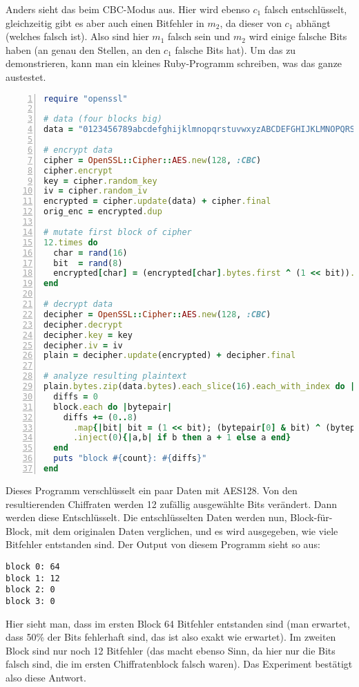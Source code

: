 \documentclass[
  ngerman,
  DIV=12
]{scrartcl}
\begin{document}
Anders sieht das beim CBC-Modus aus. Hier wird ebenso $c_1$ falsch entschlüsselt,  gleichzeitig gibt es aber auch einen Bitfehler in $m_2$, da dieser von $c_1$ abhängt (welches falsch ist). Also sind hier $m_1$ falsch sein und $m_2$ wird einige falsche Bits haben (an genau den Stellen, an den $c_1$ falsche Bits hat).
Um das zu demonstrieren, kann man ein kleines Ruby-Programm schreiben, was das ganze austestet. 
\begin{lstlisting}[language=ruby,numbers=left]
require "openssl"

# data (four blocks big)
data = "0123456789abcdefghijklmnopqrstuvwxyzABCDEFGHIJKLMNOPQRSTUVWXYZ;"

# encrypt data
cipher = OpenSSL::Cipher::AES.new(128, :CBC)
cipher.encrypt
key = cipher.random_key
iv = cipher.random_iv
encrypted = cipher.update(data) + cipher.final
orig_enc = encrypted.dup

# mutate first block of cipher
12.times do
  char = rand(16)
  bit  = rand(8)
  encrypted[char] = (encrypted[char].bytes.first ^ (1 << bit)).chr
end

# decrypt data
decipher = OpenSSL::Cipher::AES.new(128, :CBC)
decipher.decrypt
decipher.key = key
decipher.iv = iv
plain = decipher.update(encrypted) + decipher.final

# analyze resulting plaintext
plain.bytes.zip(data.bytes).each_slice(16).each_with_index do |block, count|
  diffs = 0
  block.each do |bytepair|
    diffs += (0..8)
      .map{|bit| bit = (1 << bit); (bytepair[0] & bit) ^ (bytepair[1] & bit) != 0}
      .inject(0){|a,b| if b then a + 1 else a end}
  end
  puts "block #{count}: #{diffs}"
end  
\end{lstlisting}
Dieses Programm verschlüsselt ein paar Daten mit AES128. Von den resultierenden Chiffraten werden 12 zufällig ausgewählte Bits verändert. Dann werden diese Entschlüsselt. Die entschlüsselten Daten werden nun, Block-für-Block, mit dem originalen Daten verglichen, und es wird ausgegeben, wie viele Bitfehler entstanden sind. Der Output von diesem Programm sieht so aus:
\begin{lstlisting}
block 0: 64
block 1: 12
block 2: 0
block 3: 0  
\end{lstlisting}
Hier sieht man, dass im ersten Block 64 Bitfehler entstanden sind (man erwartet, dass 50\% der Bits fehlerhaft sind, das ist also exakt wie erwartet). Im zweiten Block sind nur noch 12 Bitfehler (das macht ebenso Sinn, da hier nur die Bits falsch sind, die im ersten Chiffratenblock falsch waren). Das Experiment bestätigt also diese Antwort.
\end{document}
